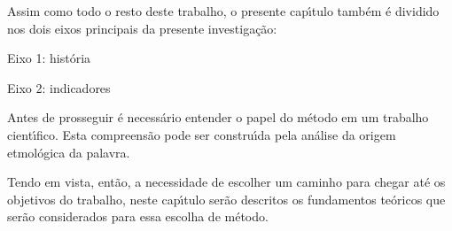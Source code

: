 \documentclass[
12pt,		%
openright,	%
twoside,  %
a4paper,			%
chapter=TITLE,		%
english,			%
french,				%
spanish,			%
brazil				%
]{USPSC-classe/USPSC}
\begin{document}
Assim como todo o resto deste trabalho, o presente cap\'{\i}tulo tamb\'em \'e dividido nos dois eixos principais da presente investiga\c{c}\~ao:


















\begin{alineas}
\item Eixo 1: hist\'oria
\item Eixo 2: indicadores
\end{alineas}

Antes de prosseguir \'e necess\'ario entender o papel do m\'etodo em um trabalho cient\'{\i}fico. Esta compreens\~ao pode ser constru\'{\i}da pela an\'alise da origem etmol\'ogica da palavra.


















\noindent\begin{center}\mbox{\centering{}}\end{center}


Tendo em vista, ent\~ao, a necessidade de escolher um caminho para chegar at\'e os objetivos do trabalho, neste cap\'{\i}tulo ser\~ao descritos os fundamentos te\'oricos que ser\~ao considerados para essa escolha de m\'etodo.
\end{document}
